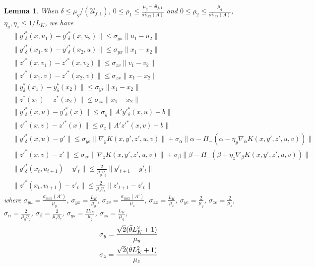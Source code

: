 \documentclass{article}
\theoremstyle{plain}
\newtheorem{lemma}[theorem]{Lemma}
\theoremstyle{definition}
\theoremstyle{remark}
\begin{document}
\begin{lemma}\label{lemma: error bounds}
When $\delta\leq \mu_g/(2l_{f,1})$, $0\leq \rho_1\leq \frac{\mu_g-\delta l_{f,1}}{\sigma_{\max}^2(A)}$ and $0\leq \rho_2\leq \frac{\mu_g}{\sigma_{\max}^2(A)}$, $\eta_y, \eta_z\leq 1/L_K$, we have
    \begin{align}
        &\|y'^*_\delta(x,u_1)-y'^*_\delta(x,u_2)\|\leq \sigma_{yu}\|u_1-u_2\| \label{sigma yu}\\
        &\|y'^*_\delta(x_1,u)-y'^*_\delta(x_2, u)\|\leq \sigma_{yx}\|x_1-x_2\| \label{sigma yx}\\
        &\|z'^*(x,v_1)-z'^*(x, v_2)\|\leq \sigma_{zv}\|v_1-v_2\| \label{sigma zv}\\
        &\|z'^*(x_1,v)-z'^*(x_2, v)\|\leq \sigma_{zx}\|x_1-x_2\| \label{sigma zx}\\        &\|y^*_\delta(x_1)-y^*_\delta(x_2)\|\leq \sigma_{ys}\|x_1-x_2\|\label{sigma ys}\\
        &\|z^*(x_1)-z^*(x_2)\|\leq \sigma_{zs}\|x_1-x_2\| \label{sigma zs}\\
        &\|y'^*_\delta(x, u)-y'^*_\delta(x)\|\leq \sigma_y\|A'y'^*_\delta(x,u)-b\| \label{sigma y}\\
        &\|z'^*(x, v)-z'^*(x)\|\leq \sigma_z\|A'z'^*(x,v)-b\| \label{sigma z}\\
        &\|y'^*_\delta(x,u)-y'\|\leq \sigma_{ye}\|\nabla_y K(x, y', z', u, v)\|+\sigma_{\alpha}\|\alpha-\Pi_-(\alpha-\eta_y \nabla_\alpha K(x, y', z', u, v))\| \label{sigma ye}\\
        &\|z'^*(x,v)-z'\|\leq \sigma_{ze}\|\nabla_z K(x, y', z', u, v)\|+\sigma_{\beta}\|\beta-\Pi_-(\beta+\eta_z \nabla_\beta K(x, y', z', u, v))\| \label{sigma ze}\\
        &\|y'^*_\delta(x_t,u_{t+1})-y'_t\|\leq \frac{2}{\mu_y\eta_y}\|y'_{t+1}-y'_t\| \label{error bound yt}\\
        &\|z'^*(x_t,v_{t+1})-z'_t\|\leq \frac{2}{\mu_z\eta_z}\|z'_{t+1}-z'_t\|\label{error bound zt}
    \end{align}
where $\sigma_{yu}=\frac{\sigma_{\max}(A')}{\mu_y}$, $\sigma_{yx}=\frac{L_K}{\mu_y}$, $\sigma_{zv}=\frac{\sigma_{\max}(A')}{\mu_z}$, $\sigma_{zx}=\frac{L_K}{\mu_z}$, $\sigma_{ye}=\frac{2}{\mu_y}$, $\sigma_{ze}=\frac{2}{\mu_z}$, 
$\sigma_{\alpha}=\frac{2}{\mu_y\eta_y}$, $\sigma_{\beta}=\frac{2}{\mu_z\eta_z}$, $\sigma_{ys}=\frac{2L_K}{\mu_g}$, $\sigma_{zs}=\frac{L_K}{\mu_g}$, 
\begin{align*}
        &\sigma_y=\frac{\sqrt{2}(\Bar{\theta}L_K^2+1)}{\mu_y}\\
        &\sigma_z=\frac{\sqrt{2}(\Bar{\theta}L_K^2+1)}{\mu_z}
    \end{align*}



\end{lemma}
\end{document}
